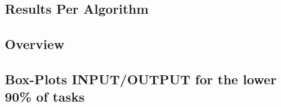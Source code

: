 \newpage{}

\begin{landscape}

\hypertarget{results-per-algorithm}{%
\section{Results Per Algorithm}\label{results-per-algorithm}}

\subsection{Overview}



\newpage
\subsection{Box-Plots INPUT/OUTPUT for the lower 90\% of tasks}



\end{landscape}
